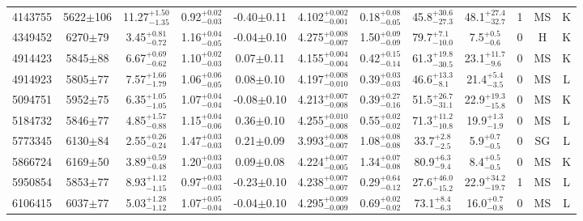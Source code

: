 \begin{landscape}
\begin{longtable}{c|ccccc|ccc|ccc}
	4143755 & 5622$\pm$106   & 11.27$_{-1.35}^{+1.50}$   & 0.92$_{-0.03}^{+0.02}$ & -0.40$\pm$0.11    & 4.102$_{-0.001}^{+0.002}$ & 0.18$_{-0.05}^{+0.08}$ & 45.8$_{-27.3}^{+30.6}$    & 48.1$_{-32.7}^{+27.4}$   & 1 &        MS & K \\
	4349452 & 6270$\pm$79    & 3.45$_{-0.72}^{+0.81}$    & 1.16$_{-0.05}^{+0.04}$ & -0.04$\pm$0.10    & 4.275$_{-0.007}^{+0.008}$ & 1.50$_{-0.09}^{+0.09}$ & 79.7$_{-10.0}^{+7.1}$      & 7.5$_{-0.6}^{+0.5}$     & 0 &        H & K \\
	4914423 & 5845$\pm$88    & 6.67$_{-0.62}^{+0.69}$    & 1.10$_{-0.03}^{+0.02}$ & 0.07$\pm$0.11     & 4.155$_{-0.004}^{+0.004}$ & 0.42$_{-0.14}^{+0.15}$ & 61.3$_{-30.5}^{+19.8}$    & 23.1$_{-9.6}^{+11.7}$    & 0 &        MS & K \\
	4914923 & 5805$\pm$77    & 7.57$_{-1.79}^{+1.66}$    & 1.06$_{-0.05}^{+0.06}$ & 0.08$\pm$0.10     & 4.197$_{-0.010}^{+0.008}$ & 0.39$_{-0.03}^{+0.03}$ & 46.6$_{-8.1}^{+13.3}$     & 21.4$_{-3.5}^{+5.4}$     & 0 &        MS & L \\
	5094751 & 5952$\pm$75    & 6.35$_{-1.05}^{+1.05}$    & 1.07$_{-0.04}^{+0.04}$ & -0.08$\pm$0.10    & 4.213$_{-0.008}^{+0.007}$ & 0.39$_{-0.16}^{+0.27}$ & 51.5$_{-31.1}^{+26.7}$    & 22.9$_{-15.8}^{+19.3}$   & 0 &        MS & K \\
	5184732 & 5846$\pm$77    & 4.85$_{-0.88}^{+1.57}$    & 1.15$_{-0.06}^{+0.04}$ & 0.36$\pm$0.10     & 4.255$_{-0.008}^{+0.010}$ & 0.55$_{-0.02}^{+0.02}$ & 71.3$_{-10.8}^{+11.2}$    & 19.9$_{-1.9}^{+1.3}$     & 0 &        MS & L \\
	5773345 & 6130$\pm$84    & 2.55$_{-0.24}^{+0.26}$    & 1.47$_{-0.03}^{+0.03}$ & 0.21$\pm$0.09     & 3.993$_{-0.007}^{+0.008}$ & 1.08$_{-0.08}^{+0.08}$ & 33.7$_{-2.5}^{+2.8}$      & 5.9$_{-0.5}^{+0.7}$      & 0 &        SG & L \\
	5866724 & 6169$\pm$50    & 3.89$_{-0.48}^{+0.59}$    & 1.20$_{-0.03}^{+0.03}$ & 0.09$\pm$0.08     & 4.224$_{-0.005}^{+0.007}$ & 1.34$_{-0.08}^{+0.07}$ & 80.9$_{-9.4}^{+6.3}$      & 8.4$_{-0.5}^{+0.5}$      & 0 &        MS & K \\
	5950854 & 5853$\pm$77    & 8.93$_{-1.15}^{+1.12}$    & 0.97$_{-0.03}^{+0.03}$ & -0.23$\pm$0.10    & 4.238$_{-0.007}^{+0.007}$ & 0.29$_{-0.12}^{+0.64}$ & 27.6$_{-15.2}^{+46.0}$    & 22.9$_{-19.7}^{+34.2}$   & 1 &        MS & L \\
	6106415 & 6037$\pm$77    & 5.03$_{-1.12}^{+1.28}$    & 1.07$_{-0.04}^{+0.05}$ & -0.04$\pm$0.10    & 4.295$_{-0.009}^{+0.009}$ & 0.69$_{-0.02}^{+0.02}$ & 73.1$_{-6.3}^{+8.4}$      & 16.0$_{-0.8}^{+0.7}$     & 0 &        MS & L \\

\end{longtable}
\end{landscape}
